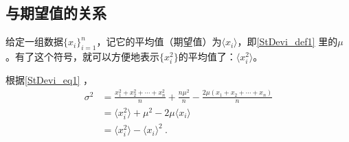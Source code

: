 \subsection{与期望值的关系}

给定一组数据$\{x_i\}_{i=1}^n$，记它的平均值（期望值）为$\langle x_i \rangle$，即\autoref{StDevi_def1} 里的$\mu$。有了这个符号，就可以方便地表示$\{x_i^2\}$的平均值了：$\langle x_i^2 \rangle$。

根据\autoref{StDevi_eq1} ，
\begin{equation}
\begin{aligned}
\sigma^2 &= \frac{x_1^2+x_2^2+\cdots+x_n^2}{n}+\frac{n\mu^2}{n}-\frac{2\mu(x_1+x_2+\cdots+x_n)}{n}\\
&=\langle x_i^2 \rangle+\mu^2-2\mu\langle x_i \rangle\\
&=\langle x_i^2 \rangle-\langle x_i \rangle^2~.
\end{aligned}
\end{equation}

